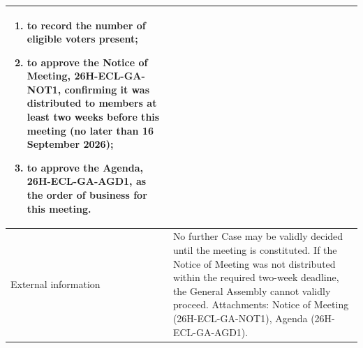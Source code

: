 \documentclass{../../../Common/Latex/Templates/rapport}
\begin{document}
\begin{tabularx}{\textwidth}{|>{\bfseries\raggedright\arraybackslash}p{4.2cm}|X|}
\begin{enumerate}[label=(\alph*), leftmargin=1.4em, itemsep=0.25em, topsep=0.2em]
    \item to record the number of eligible voters present;
    \item to approve the Notice of Meeting, 26H-ECL-GA-NOT1, confirming it was distributed to members at least two weeks before this meeting (no later than 16 September 2026);
    \item to approve the Agenda, 26H-ECL-GA-AGD1, as the order of business for this meeting.
  \end{enumerate}                                                                                                                                                                                                                                                                                          \\
  \hline
  External information & No further Case may be validly decided until the meeting is constituted. If the Notice of Meeting was not distributed within the required two-week deadline, the General Assembly cannot validly proceed. Attachments: Notice of Meeting (26H-ECL-GA-NOT1), Agenda (26H-ECL-GA-AGD1).                                                                                                                                                          \\
  \hline
\end{tabularx}
\end{document}
